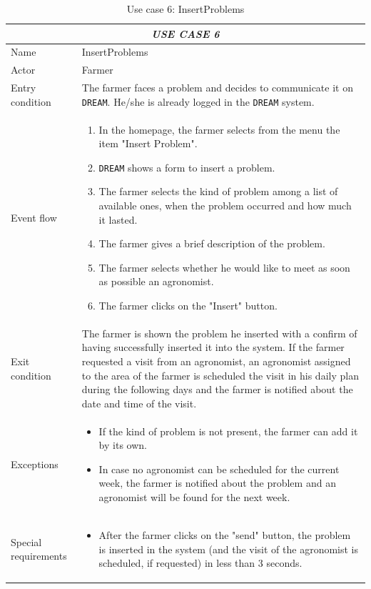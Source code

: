 \documentclass{article}
\begin{document}
\begin{longtable}{|p{3.5cm}|m{8cm}|}
\caption{Use case 6: InsertProblems}
 \label{uc6}
 \hline
 \multicolumn{2}{|c|}{\cellcolor{white}\emph{USE CASE 6}} \\
 \endfirsthead
 \endhead
 \endfoot
 \endlastfoot
 \hline
 Name & InsertProblems\\
 \hline
 Actor & Farmer\\
 \hline
 Entry condition & The farmer faces a problem and decides to communicate it on \verb|DREAM|. He/she is already logged in the \verb|DREAM| system.\\
 \hline
 Event flow & \begin{enumerate}
    \item In the homepage, the farmer selects from the menu the item "Insert Problem".
    \item \verb|DREAM| shows a form to insert a problem.
    \item The farmer selects the kind of problem among a list of available ones, when the problem occurred and how much it lasted.
    \item The farmer gives a brief description of the problem.
    \item The farmer selects whether he would like to meet as soon as possible an agronomist.
    \item The farmer clicks on the "Insert" button.
    \color{black}
 \end{enumerate}\\
 \hline
 Exit condition & The farmer is shown the problem he inserted with a confirm of having successfully inserted it into the system.
 If the farmer requested a visit from an agronomist, an agronomist assigned to the area of the farmer is scheduled the visit in his daily plan during the following days and the farmer is notified about the date and time of the visit.\\
 \hline
 Exceptions & \begin{itemize}
     \item If the kind of problem is not present, the farmer can add it by its own.
     \item In case no agronomist can be scheduled for the current week, the farmer is notified about the problem and an agronomist will be found for the next week.
 \end{itemize}\\
 \hline
 Special requirements & \begin{itemize}
     \item After the farmer clicks on the "send" button, the problem is inserted in the system (and the visit of the agronomist is scheduled, if requested) in less than 3 seconds.
 \end{itemize}\\
 \hline
\end{longtable}
\end{document}
